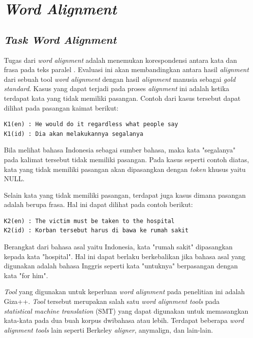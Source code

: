 \section{\textit{Word Alignment}}

\subsection{\textit{Task Word Alignment}}
Tugas dari \textit{word alignment} adalah menemukan korespondensi antara kata dan frasa pada teks paralel 
\citep{mihalcea2003evaluation}. Evaluasi ini akan membandingkan antara hasil \textit{alignment} dari sebuah tool \textit{word alignment} dengan hasil \textit{alignment} manusia sebagai \textit{gold standard}. Kasus yang dapat terjadi pada proses \textit{alignment} ini adalah ketika terdapat kata yang tidak memiliki pasangan. Contoh dari kasus tersebut dapat dilihat pada pasangan kaimat berikut:

\begin{lstlisting}
K1(en) : He would do it regardless what people say
K1(id) : Dia akan melakukannya segalanya
\end{lstlisting}


Bila melihat bahasa Indonesia sebagai sumber bahasa, maka kata "segalanya" pada kalimat tersebut tidak memiliki pasangan. Pada kasus seperti contoh diatas, kata yang tidak memiliki pasangan akan dipasangkan dengan \textit{token} khusus yaitu NULL.


Selain kata yang tidak memiliki pasangan, terdapat juga kasus dimana pasangan adalah berupa frasa. Hal ini dapat dilihat pada contoh berikut:

\begin{lstlisting}
K2(en) : The victim must be taken to the hospital
K2(id) : Korban tersebut harus di bawa ke rumah sakit
\end{lstlisting}

Berangkat dari bahasa asal yaitu Indonesia, kata "rumah sakit" dipasangkan kepada kata "hospital". Hal ini dapat berlaku berkebalikan jika bahasa asal yang digunakan adalah bahasa Inggris seperti kata "untuknya" berpasangan dengan kata "for him".

\textit{Tool} yang digunakan untuk keperluan \textit{word alignment} pada penelitian ini adalah Giza++. \textit{Tool} tersebut merupakan salah satu \textit{word alignment tools} pada \textit{statistical machine translation} (SMT) yang dapat digunakan untuk memasangkan kata-kata pada dua buah korpus dwibahasa atau lebih. Terdapat beberapa \textit{word alignment tools} lain seperti Berkeley \textit{aligner}, anymalign, dan lain-lain.

